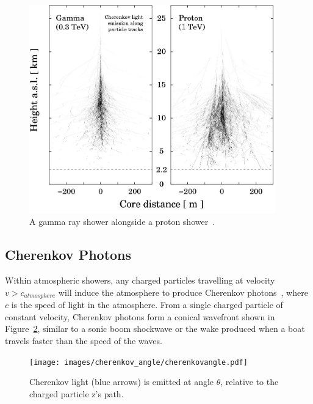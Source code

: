   \begin{figure}[ht]
    \centering
    \includegraphics[width=0.95\textwidth]{images/showers_gamma_proton}
    \caption[Gamma Ray and Proton Showers]{
      A gamma ray shower alongside a proton shower~\cite{Bernlohr2008149}.
    }
    \label{fig:gamma_vs_proton_airshower}
  \end{figure}
  
  \FloatBarrier

  \subsection{Cherenkov Photons}\label{sec:cherenkov}

  Within atmospheric showers, any charged particles travelling at velocity $v > c_{atmosphere}$ will induce the atmosphere to produce Cherenkov photons~\cite{cherenkov}, where $c$ is the speed of light in the atmosphere.
  From a single charged particle of constant velocity, Cherenkov photons form a conical wavefront shown in Figure~\ref{fig:cherenkovangle}, similar to a sonic boom shockwave or the wake produced when a boat travels faster than the speed of the waves.

  \begin{figure}[ht]
    \centering
    \texttt{[image: images/cherenkov\_angle/cherenkovangle.pdf]}
    \caption[Chernekov Emission Angle]{
      Cherenkov light (blue arrows) is emitted at angle $\theta$, relative to the charged particle z's path.
    }
    \label{fig:cherenkovangle}
  \end{figure}

